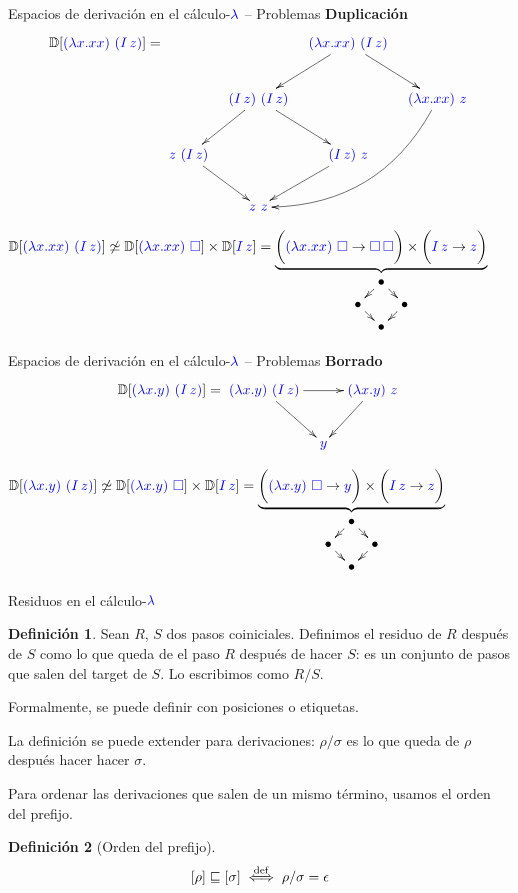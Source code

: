 \documentclass{beamer}
\theoremstyle{definition}
\newtheorem{defes}{Definición}
\newcommand{\cLam}[1]{{\color{darkBlue} #1}}
\newcommand{\clambda}{\cLam{\lambda}}
\begin{document}
\begin{frame}{Espacios de derivación en el cálculo-$\clambda$ -- Problemas}
\textbf{Duplicación}
\[\ulbDeriv{\cLam{(\lam{x}{x x})\ (I\, z)}} =
\xymatrix@C=0.3cm{
& & \cLam{(\lam{x}{x x})\ (I\, z)} \ar[dr] \ar[dl] & \\
& \cLam{(I\, z)\ (I\, z)} \ar[dr] \ar[dl] & & \cLam{(\lam{x}{x x})\ z} \ar@/^2.0pc/[ddll]\\
\cLam{z\ (I\, z)} \ar[dr] & & \cLam{(I\, z)\ z} \ar[dl] & \\
 & \cLam{z\ z} & & \\
}
\]

{\footnotesize
$\ulbDeriv{\cLam{(\lam{x}{x x})\ (I\, z)}}
\not\simeq
\ulbDeriv{\cLam{(\lam{x}{x x})\ \conbase}} \times \ulbDeriv{\cLam{I\, z}}
=
\underbrace{\bigg(\cLam{(\lam{x}{x x})\ \conbase} \to \cLam{\conbase \, \conbase}\bigg) \times \bigg(\cLam{I\, z} \to \cLam{z}\bigg)}_{\xymatrix@=0.2cm{
& \bullet \ar[dr] \ar[dl] & \\
\bullet \ar[dr] & & \bullet \ar[dl] \\
& \bullet &}}$
}
\end{frame}

\begin{frame}{Espacios de derivación en el cálculo-$\clambda$ -- Problemas}
\textbf{Borrado}
\[\ulbDeriv{\cLam{(\lam{x}{y})\ (I\, z)}} =
\xymatrix@C=0.3cm{
\cLam{(\lam{x}{y})\ (I\, z)} \ar[rr] \ar[dr] & & \cLam{(\lam{x}{y})\ z} \ar[dl]\\
& \cLam{y} & \\
}
\]

{\footnotesize
$\ulbDeriv{\cLam{(\lam{x}{y})\ (I\, z)}}
\not\simeq
\ulbDeriv{\cLam{(\lam{x}{y})\ \conbase}} \times \ulbDeriv{\cLam{I\, z}}
=
\underbrace{\bigg(\cLam{(\lam{x}{y})\ \conbase} \to \cLam{y}\bigg) \times \bigg(\cLam{I\, z} \to \cLam{z}\bigg)}_{\xymatrix@=0.2cm{
& \bullet \ar[dr] \ar[dl] & \\
\bullet \ar[dr] & & \bullet \ar[dl] \\
& \bullet &}}$
}
\end{frame}

\begin{frame}{Residuos en el cálculo-$\clambda$}
\begin{defes}
Sean $R$, $S$ dos pasos coiniciales. Definimos el residuo de $R$ después de $S$ como lo que queda
de el paso $R$ después de hacer $S$: es un conjunto de pasos que salen del target de $S$.
Lo escribimos como $R/S$.

Formalmente, se puede definir con posiciones o etiquetas.
\end{defes}
\vskip 0.2cm
La definición se puede extender para derivaciones: $\rho/\sigma$ es lo que
queda de $\rho$ después hacer hacer $\sigma$.

\vskip 0.7cm

Para ordenar las derivaciones que salen de un mismo término, usamos el orden del prefijo.

\begin{defes}[Orden del prefijo]
\[[\rho] \sqsubseteq [\sigma]   \overset{\mathrm{def}}{\iff} \rho / \sigma = \epsilon\]
\end{defes}
\end{frame}
\end{document}

